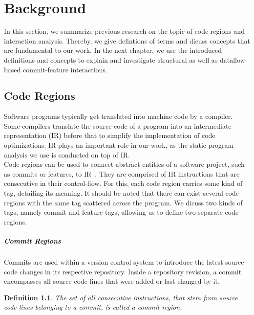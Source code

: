 \chapter{Background}\label{ch:background}

In this section, we summarize previous research on the topic of code regions and interaction analysis.
Thereby, we give defintions of terms and dicuss concepts that are fundamental to our work.
In the next chapter, we use the introduced definitions and concepts to explain and investigate structural as well as dataflow-based commit-feature interactions.

\section{Code Regions}\label{ch:code_regions}
Software programs typically get translated into machine code by a compiler.
Some compilers translate the source-code of a program into an intermediate representation (IR) before that to simplify the implementation of code optimizations.
IR plays an important role in our work, as the static program analysis we use is conducted on top of IR. \\
Code regions can be used to connect abstract entities of a software project, such as commits or features, to IR~\cite{sattler2023seal}.
They are comprised of IR instructions that are consecutive in their control-flow.
For this, each code region carries some kind of tag, detailing its meaning.
It should be noted that there can exist several code regions with the same tag scattered across the program.
We dicuss two kinds of tags, namely commit and feature tags, allowing us to define two separate code regions. 

\paragraph{Commit Regions}\label{sec:commit_regions}

Commits are used within a version control system to introduce the latest source code changes in its respective repository.
Inside a repository revision, a commit encompasses all source code lines that were added or last changed by it. 

\newtheorem{definition}{Definition}
\begin{definition}\label{def:commit_regions}
	\emph{The set of all consecutive instructions, that stem from source code lines belonging to a commit, is called a} commit region.
\end{definition}

